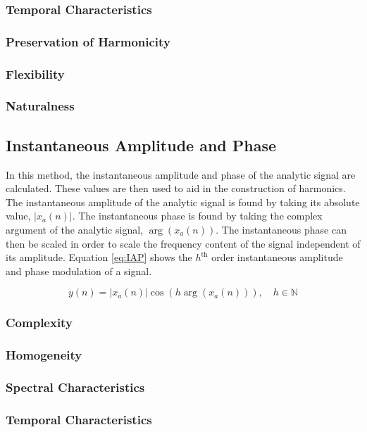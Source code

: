 		\subsubsection*{Temporal Characteristics}
		\subsubsection*{Preservation of Harmonicity}
		\subsubsection*{Flexibility}
		\subsubsection*{Naturalness}

	\subsection{Instantaneous Amplitude and Phase}
	\label{sec:Excitation-IAP}
		In this method, the instantaneous amplitude and phase of the analytic signal are calculated. These values
		are then used to aid in the construction of harmonics. The instantaneous amplitude of the analytic signal
		is found by taking its absolute value, $|x_{a}(n)|$. The instantaneous phase is found by taking the complex
		argument of the analytic signal, $\arg(x_{a}(n))$. The instantaneous phase can then be scaled in order to
		scale the frequency content of the signal independent of its amplitude. Equation \ref{eq:IAP} shows the
		$h^{\text{th}}$ order instantaneous amplitude and phase modulation of a signal.

		\begin{equation}
			y(n) = |x_{a}(n)| \cos \left( h\arg(x_{a}(n)) \right), \quad h \in \mathbb{N}
			\label{eq:IAP}
		\end{equation}

		\subsubsection*{Complexity}
		\subsubsection*{Homogeneity}
		\subsubsection*{Spectral Characteristics}
		\subsubsection*{Temporal Characteristics}
